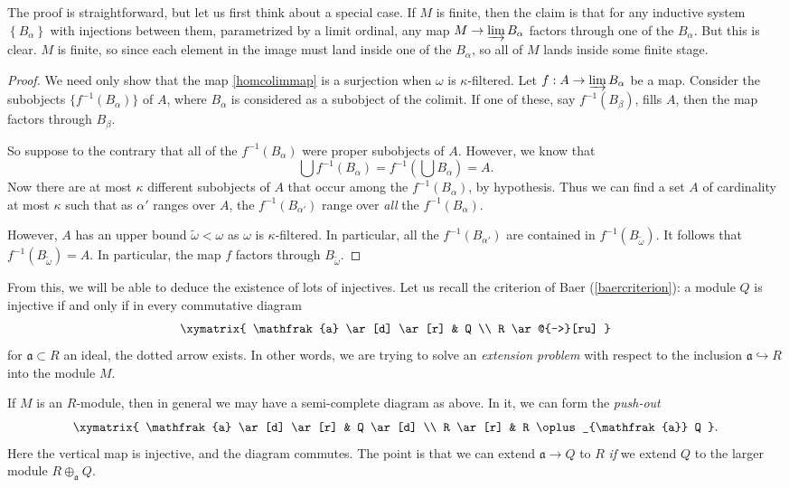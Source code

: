 The proof is straightforward, but let us first think about a special case. If
$M$ is finite, then the claim is that for any inductive system
$\left\{B_\alpha\right\}$ with injections between them, parametrized by a
limit ordinal, any map $M \to
\varinjlim B_\alpha$ factors through one of the $B_\alpha$. But this is clear. 
$M$ is finite, so since each element in the image must land inside one of the
$B_\alpha$, so all of $M$ lands inside some finite stage.
\begin{proof} 
We need only show that the map \cref{homcolimmap} is a surjection when
$\omega$ is $\kappa$-filtered.
Let $f: A \to \varinjlim B_\alpha$ be a map.
Consider the subobjects $\{f^{-1}(B_\alpha)\}$ of $A$, where $B_\alpha$ is considered as a
subobject of the colimit. If one of these, say $f^{-1}(B_\beta)$, fills $A$,
then the map factors through $B_\beta$.

So suppose to the contrary that all of the $f^{-1}(B_\alpha)$ were proper
subobjects of $A$.
However, we know that
\[ \bigcup f^{-1}(B_\alpha) = f^{-1}\left(\bigcup B_\alpha\right) = A.  \]
Now there are at most $\kappa$ different subobjects of $A$ that occur among
the $f^{-1}(B_\alpha)$, by hypothesis. 
Thus we can find a set $A$ of cardinality at most $\kappa$ such that as
$\alpha'$ ranges over $A$, the
$f^{-1}(B_{\alpha'})$ range over \emph{all} the $f^{-1}(B_\alpha)$.

However, $A$ has an upper bound $\widetilde{\omega} < \omega$ as $\omega$ is
$\kappa$-filtered. In particular,
all the $f^{-1}(B_{\alpha'})$ are contained in
$f^{-1}(B_{\widetilde{\omega}})$. It follows that
$f^{-1}(B_{\widetilde{\omega}}) = A$. 
In particular, the map $f$ factors through $B_{\widetilde{\omega}}$.
\end{proof} 

From this, we will be able to deduce the existence of lots of injectives.
Let us recall the criterion of Baer (\cref{baercriterion}): a module $Q$ is
injective if and only if in every commutative diagram
\[ \xymatrix{
\mathfrak{a} \ar[d]  \ar[r] &  Q \\
R \ar@{-->}[ru]
}\]
for $\mathfrak{a} \subset R$ an ideal, the dotted arrow exists. In other
words, we are trying to solve an \emph{extension problem} with respect to the
inclusion $\mathfrak{a} \hookrightarrow R$ into the module $M$.

If $M$ is an $R$-module, then in general we may have a semi-complete diagram as above. In
it, we can form the \emph{push-out}
\[ \xymatrix{
\mathfrak{a} \ar[d]  \ar[r] &  Q \ar[d] \\
R \ar[r] &  R \oplus_{\mathfrak{a}} Q 
}.\]
Here the vertical map is injective, and the diagram commutes.  The point is
that we can extend $\mathfrak{a} \to Q$ to $R$ \emph{if} we extend $Q$ to the
larger module $R \oplus_{\mathfrak{a}} Q$.


